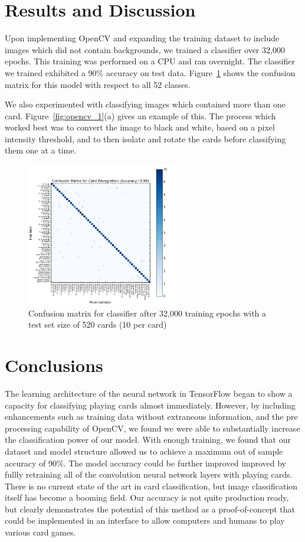 \documentclass[letterpaper]{article}
\begin{document}
\section{Results and Discussion}
Upon implementing OpenCV and expanding the training dataset to include images which did not contain backgrounds, we trained a classifier over 32,000 epochs. This training was performed on a CPU and ran overnight. 
The classifier we trained exhibited a 90\% accuracy on test data. Figure~\ref{fig:confus} shows the confusion matrix for this model with respect to all 52 classes.

We also experimented with classifying images which contained more than one card. Figure~\ref{fig:opencv_1}(a) gives an example of this. The process which worked best was to convert the image to black and white, based on a pixel intensity threshold, and to then isolate and rotate the cards before classifying them one at a time.
\begin{figure}[!tbp]
\centering
\includegraphics[width=0.6\textwidth]{results/confusion.png}
\caption{\label{fig:confus}Confusion matrix for classifier after 32,000 training epochs with a test set size of 520 cards (10 per card)}
\end{figure}
\section{Conclusions}
The learning architecture of the neural network in TensorFlow began to show a capacity for classifying playing cards almost immediately. However, by including enhancements such as training data without extraneous information, and the pre processing capability of OpenCV, we found we were able to substantially increase the classification power of our model. With enough training, we found that our dataset and model structure allowed us to achieve a maximum out of sample accuracy of 90\%.  The model accuracy could be further improved improved by fullly retraining all of the convolution neural network layers with playing cards.   There is no current state of the art in card classification, but image classification itself has become a booming field. Our accuracy is not quite production ready, but clearly demonstrates the potential of this method as a proof-of-concept that could be implemented in an interface to allow computers and humans to play various card games.

\nocite{*}


\end{document}
